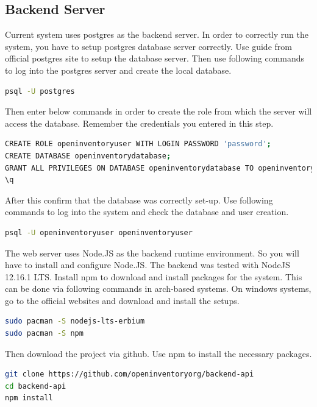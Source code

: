 \documentclass[12pt,a4paper]{article}
\begin{document}
\subsection{Backend Server}

Current system uses postgres as the backend server. In order to correctly run the system, you have to setup postgres database server correctly. Use guide from official postgres site to setup the database server. Then use following commands to log into the postgres server and create the local database.

\begin{lstlisting}[language=Bash]
psql -U postgres
\end{lstlisting}

\noindent Then enter below commands in order to create the role from which the server will access the database. Remember the credentials you entered in this step.

\begin{lstlisting}[language=Bash]
CREATE ROLE openinventoryuser WITH LOGIN PASSWORD 'password';
CREATE DATABASE openinventorydatabase;
GRANT ALL PRIVILEGES ON DATABASE openinventorydatabase TO openinventoryuser;
\q
\end{lstlisting}

\noindent After this confirm that the database was correctly set-up. Use following commands to log into the system and check the database and user creation.

\begin{lstlisting}[language=Bash]
psql -U openinventoryuser openinventoryuser
\end{lstlisting}

\noindent The web server uses Node.JS as the backend runtime environment. So you will have to install and configure Node.JS. The backend was tested with NodeJS 12.16.1 LTS. Install npm to download and install packages for the system. This can be done via following commands in arch-based systems. On windows systems, go to the official websites and download and install the setups.

\begin{lstlisting}[language=Bash]
sudo pacman -S nodejs-lts-erbium
sudo pacman -S npm
\end{lstlisting}

\noindent Then download the project via github. Use npm to install the necessary packages.

\begin{lstlisting}[language=Bash]
git clone https://github.com/openinventoryorg/backend-api
cd backend-api
npm install
\end{lstlisting}
\end{document}
